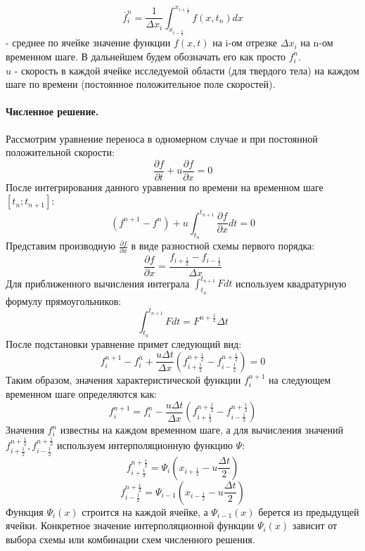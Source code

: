 \documentclass[12pt,a4paper]{article}
\begin{document}
\begin{equation}
\overline{f}_i^n=\frac{1}{\Delta x_i}\int_{x_{i-\frac{1}{2}}}^{x_{i+\frac{1}{2}}}f(x,t_n)dx 
\end{equation}
- среднее по ячейке значение функции $f(x,t)$ на i-ом отрезке $\Delta x_i$ на n-ом временном шаге. В дальнейшем будем обозначать его как просто $f_i^n$.\\
$u$ - скорость в каждой ячейке исследуемой области (для твердого тела) на каждом шаге по времени (постоянное положительное поле скоростей).

\paragraph{Численное решение.}
Рассмотрим уравнение переноса в одномерном случае и при постоянной положительной скорости:
\[
\frac{\partial f}{\partial t}+u\frac{\partial f}{\partial x}=0
\]
После интегрирования данного уравнения по времени на временном шаге $[t_n; t_{n+1}]$:
\[
(f^{n+1}-f^n)+u\int_{t_n}^{t_{n+1}}\frac{\partial f}{\partial x} dt=0
\]
Представим производную $\frac{\partial f}{\partial x}$ в виде разностной схемы первого порядка:
\[
\frac{\partial f}{\partial x}=\frac{f_{i+\frac{1}{2}}-f_{i-\frac{1}{2}}}{\Delta x}
\]
Для приближенного вычисления интеграла $\int_{t_n}^{t_{n+1}}F dt$ используем квадратурную формулу прямоугольников:
\[
\int_{t_n}^{t_{n+1}}F dt=F^{n+\frac{1}{2}}\Delta t
\]
После подстановки уравнение примет следующий вид:
\[
f_i^{n+1}-f_i^n+\frac{u\Delta t}{\Delta x}(f_{i+\frac{1}{2}}^{n+\frac{1}{2}}-f_{i-\frac{1}{2}}^{n+\frac{1}{2}})=0
\]
Таким образом, значения характеристической функции $f_i^{n+1}$ на следующем временном шаге определяются как:
\[
f_i^{n+1}=f_i^n-\frac{u\Delta t}{\Delta x}(f_{i+\frac{1}{2}}^{n+\frac{1}{2}}-f_{i-\frac{1}{2}}^{n+\frac{1}{2}})
\]
Значения $f_i^n$ известны на каждом временном шаге, а для вычисления значений $f_{i+\frac{1}{2}}^{n+\frac{1}{2}}, f_{i-\frac{1}{2}}^{n+\frac{1}{2}}$ используем интерполяционную функцию $\Psi$:
\[
f_{i+\frac{1}{2}}^{n+\frac{1}{2}}=\Psi_i(x_{i+\frac{1}{2}}-u\frac{\Delta t}{2})
\]
\[
f_{i-\frac{1}{2}}^{n+\frac{1}{2}}=\Psi_{i-1}(x_{i-\frac{1}{2}}-u\frac{\Delta t}{2})
\]
Функция $\Psi_i(x)$ строится на каждой ячейке, а $\Psi_{i-1}(x)$ берется из предыдущей ячейки. Конкретное значение интерполяционной функции $\Psi_i(x)$ зависит от выбора схемы или комбинации схем численного решения.
\end{document}

